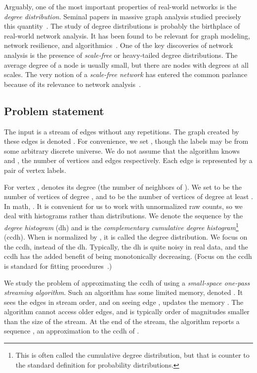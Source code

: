 \documentclass[11pt]{article}
\theoremstyle{definition}
\begin{document}
Arguably, one of the most important properties of real-world networks is the \emph{degree distribution}. Seminal papers
in massive graph analysis studied precisely this quantity~\cite{BarabasiAlbert99,FFF99,BrKu+00}.
The study of degree distributions
is probably the birthplace of real-world network analysis. It has been found to be relevant for graph modeling, network resilience, and algorithmics~\cite{CoEr+00,NeStWa01,PeFlLa+02,Ne03,Mi03,ChFa06,SeKoPi11}.
One of the key discoveries of network analysis is the presence
of \emph{scale-free} or heavy-tailed degree distributions. The average degree of a node is usually small,
but there are nodes with degrees at all scales. The very notion of a \emph{scale-free network} has entered the common parlance
because of its relevance to network analysis~\cite{Wiki-scale}.

\subsection{Problem statement} \label{sec:problem}

The input is a stream of edges  without any repetitions.
The graph created by these edges is denoted . For convenience,
we set , though the labels may be from some arbitrary discrete universe.
We do not assume that the algorithm knows  and , the number of vertices
and edges respectively.
Each edge is represented by a pair  of vertex labels.

For vertex ,  denotes its degree (the number of neighbors of ).
We set  to be the number of vertices of degree , and  to be the number
of vertices of degree at least . In math, .
It is convenient for us to work with unnormalized raw counts, so we deal
with histograms rather than distributions.
We denote the sequence  by the \emph{degree histogram} (dh) and
 is the \emph{complementary cumulative degree histogram}\footnote{This is often
called the cumulative degree distribution, but that is counter to the standard
definition for probability distributions.} (ccdh).
When  is normalized by , it is called the degree distribution.
We focus on the ccdh, instead of the dh. Typically, the dh is quite noisy in real data, and
the ccdh has the added benefit of being monotonically decreasing. (Focus on the ccdh is standard
for fitting procedures~\cite{ClShNe09}.)

We study the problem of approximating the ccdh of  using a \emph{small-space one-pass streaming algorithm}.
Such an algorithm has some limited memory, denoted . It sees the edges in stream order,
and on seeing edge , updates the memory . The algorithm cannot access older edges,
and  is typically order of magnitudes smaller than the size of the stream. At the end of the stream,
the algorithm reports a sequence , an approximation to the ccdh of .
\end{document}
